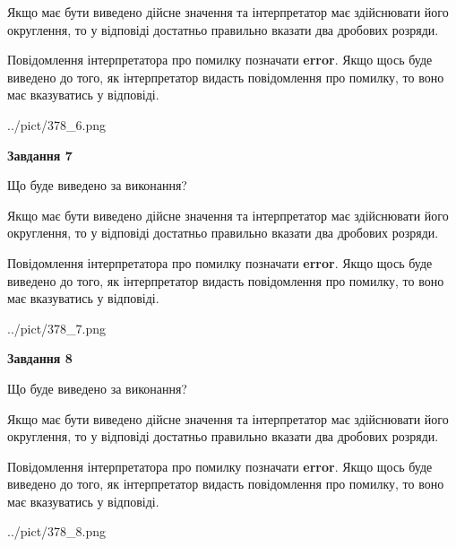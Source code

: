 \documentclass[12pt, ukrainian]{article}
\begin{document}
{\begin {Large}
Якщо має бути виведено дійсне значення та інтерпретатор має здійснювати його округлення, 
то у відповіді достатньо правильно вказати два дробових розряди.

Повідомлення інтерпретатора про помилку позначати \textbf{error}.
Якщо щось буде виведено до того, як інтерпретатор видасть повідомлення про помилку, 
то воно має вказуватись у відповіді. \par

\begin{center}
	{../pict/378_6.png}
\end{center}
\newpage

{\begin {center}\textbf{Завдання 7}\end {center}}\par
Що буде виведено за виконання? \par

Якщо має бути виведено дійсне значення та інтерпретатор має здійснювати його округлення, 
то у відповіді достатньо правильно вказати два дробових розряди.

Повідомлення інтерпретатора про помилку позначати \textbf{error}.
Якщо щось буде виведено до того, як інтерпретатор видасть повідомлення про помилку, 
то воно має вказуватись у відповіді. \par

\begin{center}
	{../pict/378_7.png}
\end{center}
\newpage

{\begin {center}\textbf{Завдання 8}\end {center}}\par
Що буде виведено за виконання? \par

Якщо має бути виведено дійсне значення та інтерпретатор має здійснювати його округлення, 
то у відповіді достатньо правильно вказати два дробових розряди.

Повідомлення інтерпретатора про помилку позначати \textbf{error}.
Якщо щось буде виведено до того, як інтерпретатор видасть повідомлення про помилку, 
то воно має вказуватись у відповіді. \par

\begin{center}
	{../pict/378_8.png}
\end{center}
\newpage


\end{Large}}
\end{document}
